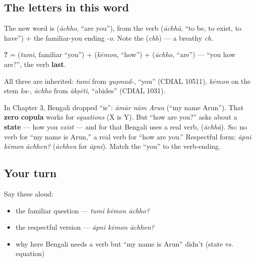 \subsection*{The letters in this word}
The new word is \textbf{} (\emph{āchho}, \textquotedblleft{}are you\textquotedblright{}), from the verb \textbf{} (\emph{āchhā}, \textquotedblleft{}to be, to exist, to have\textquotedblright{}) + the familiar-you ending \emph{-o}. Note the \textbf{} (\emph{chh}) — a breathy \emph{ch}.

\begin{cousinweb}
\textbf{  ?} = \textbf{} (\emph{tumi}, familiar \textquotedblleft{}you\textquotedblright{}) + \textbf{} (\emph{kēmon}, \textquotedblleft{}how\textquotedblright{}) + \textbf{} (\emph{āchho}, \textquotedblleft{}are\textquotedblright{}) — \textquotedblleft{}you how are?\textquotedblright{}, the verb \textbf{last}.

All three are inherited: \emph{tumi} from \emph{yuṣmad-}, \textquotedblleft{}you\textquotedblright{} (CDIAL 10511), \emph{kēmon} on the stem \emph{ka-}, \emph{āchho} from \emph{ākṣēti}, \textquotedblleft{}abides\textquotedblright{} (CDIAL 1031).
\end{cousinweb}

\begin{grammarlens}[title={Grammar Lens: now the copula returns}]
In Chapter 3, Bengali dropped \textquotedblleft{}is\textquotedblright{}: \emph{āmār nām Arun} (\textquotedblleft{}my name Arun\textquotedblright{}). That \textbf{zero copula} works for \emph{equations} (X is Y). But \textquotedblleft{}how are you?\textquotedblright{} asks about a \textbf{state} — how you \emph{exist} — and for that Bengali uses a real verb, \textbf{} (\emph{āchhā}). So: no verb for \textquotedblleft{}my name is Arun,\textquotedblright{} a real verb for \textquotedblleft{}how are you.\textquotedblright{} Respectful form: \emph{āpni kēmon āchhen?} (\emph{āchhen} for \emph{āpni}). Match the \textquotedblleft{}you\textquotedblright{} to the verb-ending.
\end{grammarlens}

\subsection*{Your turn}
Say these aloud:

\begin{itemize}
\raggedright
  \item the familiar question — \emph{tumi kēmon āchho?}
  \item the respectful version — \emph{āpni kēmon āchhen?}
  \item why here Bengali needs a verb but \textquotedblleft{}my name is Arun\textquotedblright{} didn't (state vs. equation)
\end{itemize}

